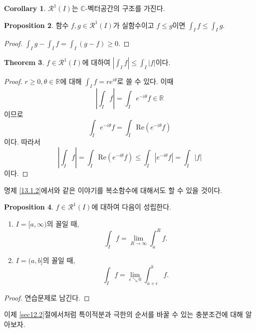 \documentclass[11pt]{book}
\numberwithin{equation}{chapter}
\def\RR{\mathbb{R}}
\def\CC{\mathbb{C}}
\def\eps{\epsilon}
\def\calR{\mathcal{R}}
\newcommand{\abs}[1]{\left\vert#1\right\vert}
\theoremstyle{definition}
\newtheorem{thm}{Theorem}[section]
\newtheorem{cor}[thm]{Corollary}
\newtheorem{prop}[thm]{Proposition}
\newenvironment{enum}
	{\begin{enumerate}[label=(\alph*), leftmargin=2\parindent]}
	{\end{enumerate}}
\begin{document}
\begin{cor}
    \(\calR^1(I)\)는 \(\CC\)-벡터공간의 구조를 가진다.
\end{cor}

\begin{prop}
    함수 \(f, g \in \calR^1(I)\)가 실함수이고 \(f \le g\)이면 \(\int_I f \le \int_I g\).
\end{prop}
\begin{proof}
    \(\int_I g - \int_I f = \int_I (g - f) \ge 0\).
\end{proof}

\begin{thm}
    \(f \in \calR^1(I)\)에 대하여 \(\abs{\int_I f} \le \int_I \abs{f}\)이다.
\end{thm}
\begin{proof}
    \(r \ge 0, \theta \in \RR\)에 대해 \(\int_I f = re^{i\theta}\)로 쓸 수 있다. 이때
    \[
        \abs{\int_I f} = \int_I e^{-i\theta} f \in \RR
    \]
    이므로
    \[
        \int_I e^{-i\theta} f = \int_I \mathrm{Re}(e^{-i\theta}f)
    \]
    이다. 따라서
    \[
        \abs{\int_I f} = \int_I \mathrm{Re}(e^{-i\theta}f) \le \int_I \abs{e^{-i\theta}f} = \int_I \abs{f}
    \]
    이다.
\end{proof}

명제 \ref{13.1.2}에서와 같은 이야기를 복소함수에 대해서도 할 수 있을 것이다.

\begin{prop} \label{13.1.13}
    \(f \in \calR^1(I)\)에 대하여 다음이 성립한다.
    \begin{enum}
        \item \(I = [a, \infty)\)의 꼴일 때,
        \begin{equation} \label{eq13.3}
            \int_I f = \lim_{R \to \infty} \int_a^R f.
        \end{equation}
        \item \(I = (a, b]\)의 꼴일 때,
        \begin{equation} \label{eq13.4}
            \int_I f = \lim_{\eps \searrow 0} \int_{a+\eps}^b f.
        \end{equation}
    \end{enum}
\end{prop}
\begin{proof}
    연습문제로 남긴다.
\end{proof}

이제 \ref{sec12.2}절에서처럼 특이적분과 극한의 순서를 바꿀 수 있는 충분조건에 대해 알아보자.
\end{document}
